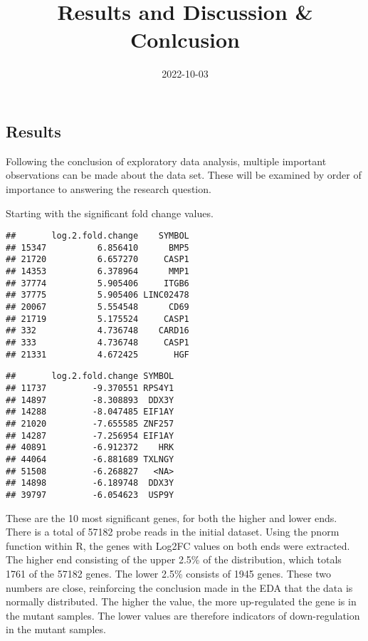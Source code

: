 \documentclass[
]{article}
\title{Results and Discussion \& Conlcusion}
\author{}
\date{\vspace{-2.5em}2022-10-03}
\begin{document}
\maketitle

\hypertarget{results}{%
\subsection{Results}\label{results}}

Following the conclusion of exploratory data analysis, multiple
important observations can be made about the data set. These will be
examined by order of importance to answering the research question.

Starting with the significant fold change values.

\begin{verbatim}
##       log.2.fold.change    SYMBOL
## 15347          6.856410      BMP5
## 21720          6.657270     CASP1
## 14353          6.378964      MMP1
## 37774          5.905406     ITGB6
## 37775          5.905406 LINC02478
## 20067          5.554548      CD69
## 21719          5.175524     CASP1
## 332            4.736748    CARD16
## 333            4.736748     CASP1
## 21331          4.672425       HGF
\end{verbatim}

\begin{verbatim}
##       log.2.fold.change SYMBOL
## 11737         -9.370551 RPS4Y1
## 14897         -8.308893  DDX3Y
## 14288         -8.047485 EIF1AY
## 21020         -7.655585 ZNF257
## 14287         -7.256954 EIF1AY
## 40891         -6.912372    HRK
## 44064         -6.881689 TXLNGY
## 51508         -6.268827   <NA>
## 14898         -6.189748  DDX3Y
## 39797         -6.054623  USP9Y
\end{verbatim}

These are the 10 most significant genes, for both the higher and lower
ends. There is a total of 57182 probe reads in the initial dataset.
Using the pnorm function within R, the genes with Log2FC values on both
ends were extracted. The higher end consisting of the upper 2.5\% of the
distribution, which totals 1761 of the 57182 genes. The lower 2.5\%
consists of 1945 genes. These two numbers are close, reinforcing the
conclusion made in the EDA that the data is normally distributed. The
higher the value, the more up-regulated the gene is in the mutant
samples. The lower values are therefore indicators of down-regulation in
the mutant samples.

\newpage
\end{document}
